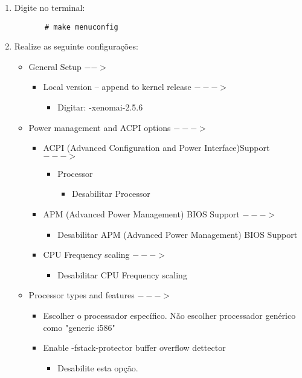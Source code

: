 \documentclass[a4paper,10pt]{article}
\begin{document}
\begin{enumerate}
	\item Digite no terminal:
	  \begin{lstlisting}
	   # make menuconfig
	  \end{lstlisting}

	\item Realize as seguinte configurações:
	  \begin{itemize}
	    \item General Setup $-->$
		\begin{itemize}
		  \item Local version – append to kernel release $--->$
		    \begin{itemize}
		      \item Digitar: -xenomai-2.5.6
		    \end{itemize}
		\end{itemize}

	      \item Power management and ACPI options $--->$
		\begin{itemize}
		  \item ACPI (Advanced Configuration and Power Interface)Support $--->$
		    \begin{itemize}
		      \item Processor
			\begin{itemize}
			  \item Desabilitar Processor
			\end{itemize}
		    \end{itemize}

		  \item APM (Advanced Power Management) BIOS Support $--->$
		    \begin{itemize}
		      \item Desabilitar APM (Advanced Power Management) BIOS Support
		    \end{itemize}

		  \item CPU Frequency scaling $--->$
		    \begin{itemize}
		      \item Desabilitar CPU Frequency scaling
		    \end{itemize}

		\end{itemize}

	      \item Processor types and features $--->$
		\begin{itemize}
		\item Escolher o processador específico. Não escolher processador genérico como "generic i586"
		\item Enable -fstack-protector buffer overflow dettector
		  \begin{itemize}
		  \item Desabilite esta opção.
		  \end{itemize}


\end{itemize}
\end{itemize}
\end{enumerate}
\end{document}

